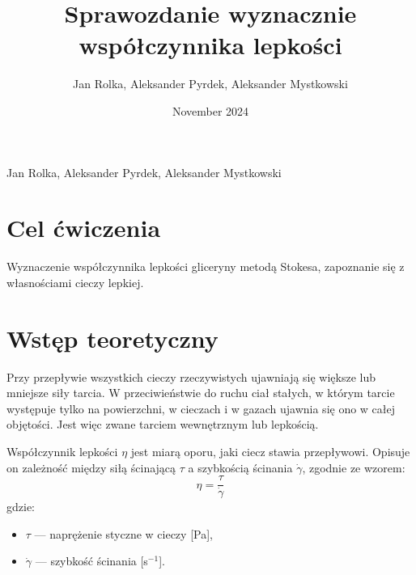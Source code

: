 \documentclass[12pt]{article}
\title{Sprawozdanie wyznacznie współczynnika lepkości}
\author{Jan Rolka, Aleksander Pyrdek, Aleksander Mystkowski}
\date{November 2024}
\begin{document}
\renewcommand{\arraystretch}{4}%
\begin{table}[]
\scriptsize
{}
\end{table}
\renewcommand{\arraystretch}{}%
\begin{center}
Jan Rolka, Aleksander Pyrdek, Aleksander Mystkowski
\end{center}
\section{Cel ćwiczenia}
Wyznaczenie współczynnika lepkości gliceryny metodą Stokesa, zapoznanie się z
własnościami cieczy lepkiej.
\section{Wstęp teoretyczny}

\vspace{0.5cm}

Przy przepływie wszystkich cieczy rzeczywistych ujawniają się większe lub mniejsze siły tarcia. W przeciwieństwie do ruchu ciał stałych, w którym tarcie występuje tylko na powierzchni, w cieczach i w gazach ujawnia się ono w całej objętości. Jest więc zwane tarciem wewnętrznym lub lepkością.

\vspace{0.5cm}

Współczynnik lepkości \(\eta\) jest miarą oporu, jaki ciecz stawia przepływowi. Opisuje on zależność między siłą ścinającą \(\tau\) a szybkością ścinania \(\dot{\gamma}\), zgodnie ze wzorem:
\[
\eta = \frac{\tau}{\dot{\gamma}}
\]
gdzie:
\begin{itemize}
    \item \(\tau\) — naprężenie styczne w cieczy [Pa],
    \item \(\dot{\gamma}\) — szybkość ścinania [s\(^{-1}\)].
\end{itemize}
\end{document}
